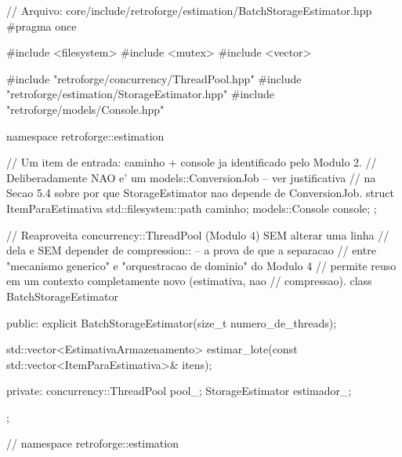 \begin{CaixaCodigo}
// Arquivo: core/include/retroforge/estimation/BatchStorageEstimator.hpp
#pragma once

#include <filesystem>
#include <mutex>
#include <vector>

#include "retroforge/concurrency/ThreadPool.hpp"
#include "retroforge/estimation/StorageEstimator.hpp"
#include "retroforge/models/Console.hpp"

namespace retroforge::estimation {

// Um item de entrada: caminho + console ja identificado pelo Modulo 2.
// Deliberadamente NAO e' um models::ConversionJob -- ver justificativa
// na Secao 5.4 sobre por que StorageEstimator nao depende de ConversionJob.
struct ItemParaEstimativa {
    std::filesystem::path caminho;
    models::Console console;
};

// Reaproveita concurrency::ThreadPool (Modulo 4) SEM alterar uma linha
// dela e SEM depender de compression:: -- a prova de que a separacao
// entre "mecanismo generico" e "orquestracao de dominio" do Modulo 4
// permite reuso em um contexto completamente novo (estimativa, nao
// compressao).
class BatchStorageEstimator {
public:
    explicit BatchStorageEstimator(size_t numero_de_threads);

    std::vector<EstimativaArmazenamento>
    estimar_lote(const std::vector<ItemParaEstimativa>& itens);

private:
    concurrency::ThreadPool pool_;
    StorageEstimator estimador_;
};

} // namespace retroforge::estimation
\end{CaixaCodigo}

